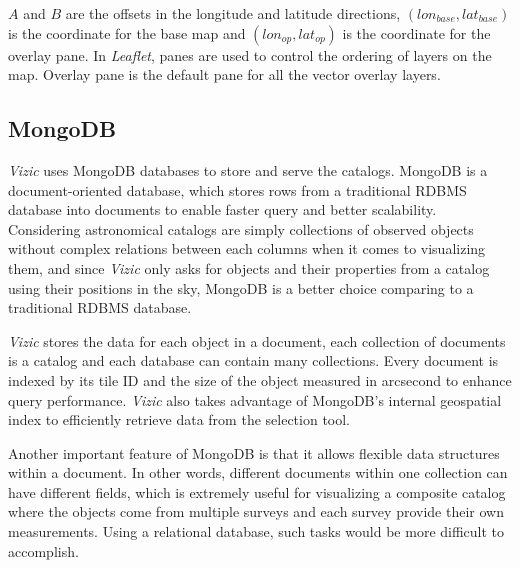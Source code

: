 \documentclass[../vis.tex]{subfiles}
\begin{document}
$A$ and $B$ are the offsets in the longitude and latitude directions, $(lon_{base},lat_{base})$ is the coordinate for the base map and  $(lon_{op},lat_{op})$ is the coordinate for the overlay pane. In \textit{Leaflet}, panes are used to control the ordering of layers on the map. Overlay pane is the default pane for all the vector overlay layers.

\subsection{MongoDB}
\label{mongodb}
\textit{Vizic} uses MongoDB databases to store and serve the catalogs.
MongoDB is a document-oriented database, which stores rows from a traditional RDBMS database into documents to enable faster query and better scalability.
Considering astronomical catalogs are simply collections of observed objects without complex relations between each columns when it comes to visualizing them, and since \textit{Vizic} only asks for objects and their properties from a catalog using their positions in the sky, MongoDB is a better choice comparing to a traditional RDBMS database.

\textit{Vizic} stores the data for each object in a document, each collection of documents is a catalog and each database can contain many collections.
Every document is indexed by its tile ID and the size of the object measured in arcsecond to enhance query performance.
\textit{Vizic} also takes advantage of MongoDB's internal geospatial index to efficiently retrieve data from the selection tool.

Another important feature of MongoDB is that it allows flexible data structures within a document.
In other words, different documents within one collection can have different fields, which is extremely useful for visualizing a composite catalog where the objects come from multiple surveys and each survey provide their own measurements.
Using a relational database, such tasks would be more difficult to accomplish.
\end{document}
